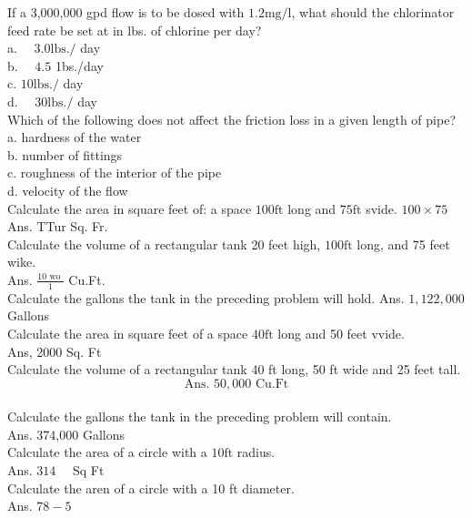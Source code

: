 If a 3,000,000 gpd flow is to be dosed with $1.2 \mathrm{mg} / \mathrm{l}$, what should the chlorinator feed rate be set at in lbs. of chlorine per day?\\
a. $\quad 3.0 \mathrm{lbs} . /$ day\\
b. $\quad 4.5$ 1bs./day\\
c. $10 \mathrm{lbs} . /$ day\\
d. $\quad 30 \mathrm{lbs} . /$ day\\

Which of the following does not affect the friction loss in a given length of pipe?\\
a. hardness of the water\\
b. number of fittings\\
c. roughness of the interior of the pipe\\
d. velocity of the flow\\

Calculate the area in square feet of: a space $100 \mathrm{ft}$ long and $75 \mathrm{ft}$ svide. $100 \times 75$ Ans. TTur Sq. Fr.\\

Calculate the volume of a rectangular tank 20 feet high, $100 \mathrm{ft}$ long, and 75 feet wike.\\
Ans. $\frac{10 \text { wo }}{1}$ Cu.Ft.\\

Calculate the gallons the tank in the preceding problem will hold. Ans. $1,122,000$ Gallons\\

Calculate the area in square feet of a space $40 \mathrm{ft}$ long and 50 feet vvide.\\
Ans, 2000 Sq. Ft\\

Calculate the volume of a rectangular tank 40 ft long, 50 ft wide and 25 feet tall.\\
$$\text { Ans. } 50,000 \text { Cu.Ft }$$\\

Calculate the gallons the tank in the preceding problem will contain.\\
Ans. 374,000 Gallons\\


Calculate the area of a circle with a $10 \mathrm{ft}$ radius.\\
Ans. $314 \quad$ Sq Ft\\

Calculate the aren of a circle with a 10 ft diameter.\\
Ans. $78-5$\\


